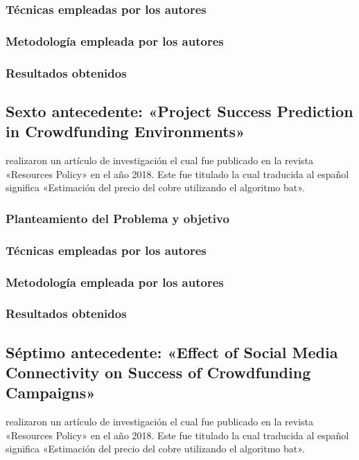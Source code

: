 \subsubsection{Técnicas empleadas por los autores}


\subsubsection{Metodología empleada por los autores}


\subsubsection{Resultados obtenidos}



\subsection{Sexto antecedente: «Project Success Prediction in Crowdfunding Environments» \citep*{pr_li2016predcrowd}}
\citeauthor{pr_li2016predcrowd} realizaron un artículo de investigación el cual fue publicado en la revista «Resources Policy» en el año 2018. Este fue titulado  la cual traducida al español significa «Estimación del precio del cobre utilizando el algoritmo bat».

\subsubsection{Planteamiento del Problema y objetivo }


\subsubsection{Técnicas empleadas por los autores}
 

\subsubsection{Metodología empleada por los autores}


\subsubsection{Resultados obtenidos}



\subsection{Séptimo antecedente: «Effect of Social Media Connectivity on Success of Crowdfunding Campaigns» \citep*{pr_kaur2017socmedcrowd}}
\citeauthor{pr_kaur2017socmedcrowd} realizaron un artículo de investigación el cual fue publicado en la revista «Resources Policy» en el año 2018. Este fue titulado  la cual traducida al español significa «Estimación del precio del cobre utilizando el algoritmo bat».

